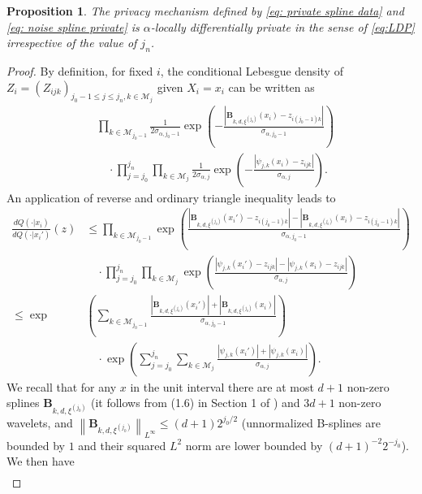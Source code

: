 \documentclass[preprint]{imsart}
\newcommand\norm[1]{\left\lVert#1\right\rVert}
\newtheorem{proposition}[theorem]{Proposition}
\numberwithin{equation}{section}
\newcounter{cond}
\begin{document}
\begin{proposition}\label{prop:PrivacyWavelets}
    The privacy mechanism defined by \eqref{eq: private spline data} and \eqref{eq: noise spline private} is $\alpha$-locally differentially private in the sense of \eqref{eq:LDP} irrespective of the value of $j_n$.
\end{proposition}

\begin{proof}
By definition, for fixed $i$, the conditional Lebesgue density of $Z_i=(Z_{ijk})_{j_0-1\leq j\leq j_n, k\in\mathcal{M}_j}$ given $X_i = x_i$ can be written as
 \begin{align*}
&\prod_{k\in\mathcal{M}_{j_0-1}}  \frac{1}{2\sigma_{\alpha,j_0-1}} \exp\left( -\frac{\left|\mathbf{B}_{k,d,\xi^{(j_0)}}(x_i)-z_{i(j_0-1)k}\right|}{\sigma_{\alpha,j_0-1}}\right)\\ &\quad\cdot \prod_{j=j_0}^{j_n}\prod_{k\in\mathcal{M}_{j}} \frac{1}{2\sigma_{\alpha, j}} \exp\left( -\frac{\left|\psi_{j,k}(x_i)-z_{ijk}\right|}{\sigma_{\alpha,j}}\right).
\end{align*}
An application of reverse and ordinary triangle inequality leads to
\begin{align*}
\frac{dQ(\cdot |x_i)}{dQ(\cdot |x_i')}(z)&\leq \prod_{k\in\mathcal{M}_{j_0-1}} \exp\left( \frac{\left|\mathbf{B}_{k,d,\xi^{(j_0)}}(x_i')-z_{i(j_0-1)k}\right|-\left|\mathbf{B}_{k,d,\xi^{(j_0)}}(x_i)-z_{i(j_0-1)k}\right|}{\sigma_{\alpha,j_0-1}}\right) \\
&\quad \cdot \prod_{j=j_0}^{j_n}\prod_{k\in\mathcal{M}_{j}} \exp\left( \frac{\left|\psi_{j,k}(x_i')-z_{ijk}\right|-\left|\psi_{j,k}(x_i)-z_{ijk}\right|}{\sigma_{\alpha,j}}\right) \\
\leq \exp&\left( \sum_{k\in\mathcal{M}_{j_0-1}}\frac{\left|\mathbf{B}_{k,d,\xi^{(j_0)}}(x_i')\right|+\left|\mathbf{B}_{k,d,\xi^{(j_0)}}(x_i)\right|}{\sigma_{\alpha,j_0-1}}\right)\\ &\quad\cdot\exp\left( \sum_{j=j_0}^{j_n}\sum_{k\in\mathcal{M}_{j}} \frac{\left|\psi_{j,k}(x_i')\right|+\left|\psi_{j,k}(x_i)\right|}{\sigma_{\alpha,j}}\right).
\end{align*}
We recall that for any $x$ in the unit interval there are at most $d+1$ non-zero splines $\mathbf{B}_{k,d,\xi^{(j_0)}}$ (it follows from (1.6) in Section 1 of \cite{LycheSpline}) and $3d+1$ non-zero wavelets, and $\norm{\mathbf{B}_{k,d,\xi^{(j_0)}}}_{L^\infty} \leq (d+1)2^{j_0/2}$ (unnormalized B-splines are bounded by $1$ and their squared $L^2$ norm are lower bounded by $(d+1)^{-2}2^{-j_0}$). We then have
\begin{align*}

\end{align*}
\end{proof}
\end{document}
